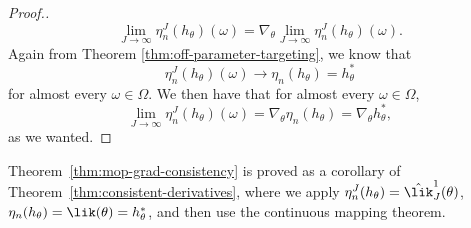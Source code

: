 \begin{proof}[Proof.]
    \begin{equation}
    \lim_{J \to \infty} \eta_n^J(h_\theta)(\omega) = \nabla_\theta \lim_{J \to \infty} \eta_n^J(h_\theta)(\omega).
    \end{equation}
Again from Theorem \ref{thm:off-parameter-targeting}, we know that
    \begin{equation}\eta_n^J(h_\theta)(\omega) \to \eta_n(h_\theta) = h^*_\theta\end{equation} for almost every $\omega\in\Omega$.
    We then have that for almost every $\omega \in \Omega$, 
    \begin{equation}
    \lim_{J \to \infty} \eta_n^J(h_\theta)(\omega) = \nabla_\theta \eta_n(h_\theta) = \nabla_\theta h^*_\theta,
    \end{equation}
    as we wanted. 
    \end{proof}
Theorem~\ref{thm:mop-grad-consistency} is proved as a corollary of Theorem~\ref{thm:consistent-derivatives}, where we apply $\eta_n^J (h_\theta) = \hat\lik^1_J(\theta)$, $\eta_n(h_\theta) = \lik(\theta) = h_\theta^*$, and then use the continuous mapping theorem. 





